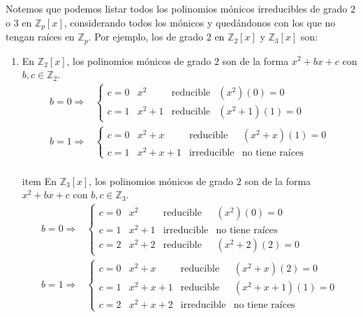 \begin{ejemplo}
    Notemos que podemos listar todos los polinomios mónicos irreducibles de grado $2$ o $3$ en $\mathbb{Z}_p[x]$, considerando todos los mónicos y quedándonos con los que no tengan raíces en $\mathbb{Z}_p$. Por ejemplo, los de grado $2$ en $\mathbb{Z}_2[x]$ y $\mathbb{Z}_3[x]$ son:
    \begin{enumerate}[label=\arabic*)]
        \item En $\mathbb{Z}_2[x]$, los polinomios mónicos de grado $2$ son de la forma $x^2 +bx + c$ con $b, c \in \mathbb{Z}_2$.
        \begin{align*}
            b=0 \Rightarrow & \left\{ \begin{array}{llll}
                c=0 & x^2   & \text{reducible} & (x^2)(0)=0   \\
                c=1 & x^2+1 & \text{reducible} & (x^2+1)(1)=0
            \end{array} \right.\\
            b=1 \Rightarrow & \left\{ \begin{array}{llll}
                c=0 & x^2+x   & \text{reducible}   & (x^2+x)(1)=0           \\
                c=1 & x^2+x+1 & \text{irreducible} & \text{no tiene raíces}
            \end{array} \right.
        \end{align*}
        \\item En $\mathbb{Z}_3[x]$, los polinomios mónicos de grado $2$ son de la forma $x^2 +bx + c$ con $b, c \in \mathbb{Z}_3$.
        \begin{align*}
            b=0 \Rightarrow & \left\{ \begin{array}{llll}
                c=0 & x^2   & \text{reducible}   & (x^2)(0) = 0           \\
                c=1 & x^2+1 & \text{irreducible} & \text{no tiene raíces} \\
                c=2 & x^2+2 & \text{reducible}   & (x^2+2)(2)=0
            \end{array} \right.\\
            b=1 \Rightarrow & \left\{ \begin{array}{llll}
                c=0 & x^2+x   & \text{reducible}   & (x^2+x)(2) = 0         \\
                c=1 & x^2+x+1 & \text{reducible}   & (x^2+x+1)(1)=0         \\
                c=2 & x^2+x+2   & \text{irreducible} & \text{no tiene raíces}

\end{array}
\end{align*}
\end{enumerate}
\end{ejemplo}
